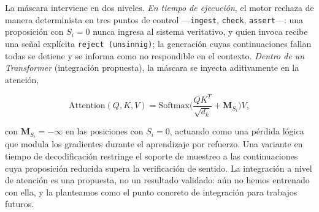 \documentclass{article}
\begin{document}
La máscara interviene en dos niveles. \emph{En tiempo de ejecución}, el
motor rechaza de manera determinista en tres puntos de control
---\texttt{ingest}, \texttt{check}, \texttt{assert}---: una proposición
con \(S_i = 0\) nunca ingresa al sistema veritativo, y quien invoca
recibe una señal explícita \texttt{reject\ (unsinnig)}; la generación
cuyas continuaciones fallan todas se detiene y se informa como no
respondible en el contexto. \emph{Dentro de un Transformer} (integración
propuesta), la máscara se inyecta aditivamente en la atención,

\[\text{Attention}(Q, K, V) = \text{Softmax}\Big(\frac{QK^T}{\sqrt{d_k}} + \mathbf{M}_{S_i}\Big) V,\]

con \(\mathbf{M}_{S_i} = -\infty\) en las posiciones con \(S_i = 0\),
actuando como una pérdida lógica que modula los gradientes durante el
aprendizaje por refuerzo. Una variante en tiempo de decodificación
restringe el soporte de muestreo a las continuaciones cuya proposición
reducida supera la verificación de sentido. La integración a nivel de
atención es una propuesta, no un resultado validado: aún no hemos
entrenado con ella, y la planteamos como el punto concreto de
integración para trabajos futuros.
\end{document}
